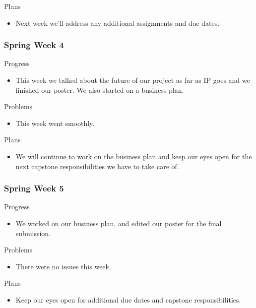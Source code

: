         \noindent
        Plans
        \begin{itemize}
            \item Next week we'll address any additional assignments and due dates.
        \end{itemize}
    \subsubsection{Spring Week 4}
        \noindent
        Progress
        \begin{itemize}
            \item This week we talked about the future of our project as far as IP goes and we finished our poster. We also started on a business plan.
        \end{itemize}
        
        \noindent
        Problems
        \begin{itemize}
            \item This week went smoothly.
        \end{itemize}
        
        \noindent
        Plans
        \begin{itemize}
            \item We will continue to work on the business plan and keep our eyes open for the next capstone responsibilities we have to take care of.
        \end{itemize}
    \subsubsection{Spring Week 5}
        \noindent
        Progress
        \begin{itemize}
            \item We worked on our business plan, and edited our poster for the final submission.
        \end{itemize}
        
        \noindent
        Problems
        \begin{itemize}
            \item There were no issues this week.
        \end{itemize}
        
        \noindent
        Plans
        \begin{itemize}
            \item Keep our eyes open for additional due dates and capstone responsibilities.
        \end{itemize}

